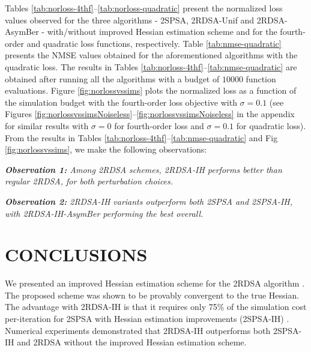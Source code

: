\documentclass[letterpaper, 10 pt, conference]{ieeeconf}  %
\begin{document}
Tables \ref{tab:norloss-4thf}--\ref{tab:norloss-quadratic} present the normalized loss values observed for the three algorithms - 2SPSA, 2RDSA-Unif and 2RDSA-AsymBer - with/without improved Hessian estimation scheme and for the fourth-order and quadratic loss functions, respectively. Table \ref{tab:nmse-quadratic} presents the NMSE values obtained for the aforementioned algorithms with the quadratic loss. The results in Tables \ref{tab:norloss-4thf}--\ref{tab:nmse-quadratic} are obtained after running all the algorithms with a budget of $10000$ function evaluations.
 Figure \ref{fig:norlossvssims} plots the normalized loss as a function of the simulation budget with the fourth-order loss objective with $\sigma=0.1$ (see Figures \ref{fig:norlossvssimsNoiseless}--\ref{fig:norlossvssimsNoiseless} in the appendix for similar results with $\sigma = 0$ for fourth-order loss and $\sigma=0.1$ for quadratic loss). From the results in Tables \ref{tab:norloss-4thf}--\ref{tab:nmse-quadratic} and Fig \ref{fig:norlossvssims}, we make the following observations:
 
\textit{\textbf{Observation 1:} Among 2RDSA schemes, 2RDSA-IH performs better than regular 2RDSA, for both perturbation choices.}

\textit{\textbf{Observation 2:} 2RDSA-IH variants outperform both 2SPSA and 2SPSA-IH, with 2RDSA-IH-AsymBer performing the best overall.}






\section{CONCLUSIONS}
\label{sec:conclusions}
We presented an improved Hessian estimation scheme for the 2RDSA algorithm \cite{prashanth2015rdsa}. 
The proposed scheme was shown to be provably convergent to the true Hessian.
The advantage with 2RDSA-IH is that it requires only 75\% of the simulation cost per-iteration for 2SPSA with Hessian estimation improvements (2SPSA-IH) \cite{spall-jacobian}. 
Numerical experiments demonstrated that 2RDSA-IH outperforms both 2SPSA-IH and 2RDSA without the improved Hessian estimation scheme.

\end{document}
